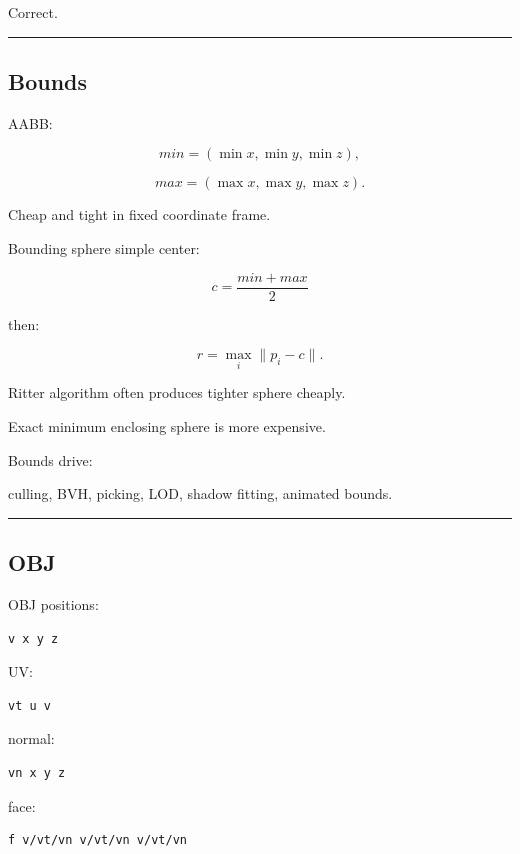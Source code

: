Correct.

\begin{center}\rule{0.5\linewidth}{0.5pt}\end{center}

\subsection{Bounds}\label{04-visual-computing-ii-ch041-bounds}

AABB:

\[
min=
(\min x,\min y,\min z),
\]

\[
max=
(\max x,\max y,\max z).
\]

Cheap and tight in fixed coordinate frame.

Bounding sphere simple center:

\[
c=
\frac{min+max}{2}
\]

then:

\[
r=
\max_i\|p_i-c\|.
\]

Ritter algorithm often produces tighter sphere cheaply.

Exact minimum enclosing sphere is more expensive.

Bounds drive:

culling, BVH, picking, LOD, shadow fitting, animated bounds.

\begin{center}\rule{0.5\linewidth}{0.5pt}\end{center}

\subsection{OBJ}\label{04-visual-computing-ii-ch041-obj}

OBJ positions:

\begin{verbatim}
v x y z
\end{verbatim}

UV:

\begin{verbatim}
vt u v
\end{verbatim}

normal:

\begin{verbatim}
vn x y z
\end{verbatim}

face:

\begin{verbatim}
f v/vt/vn v/vt/vn v/vt/vn
\end{verbatim}

